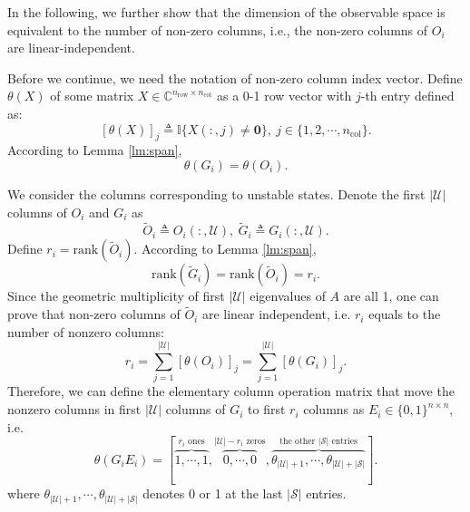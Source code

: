 \documentclass[journal]{IEEEtran}
\newcommand{\Cb}{{\mathbb{C}}}
\newcommand{\Ib}{{\mathbb{I}}}
\newcommand{\Uc}{{\mathcal{U}}}
\newcommand{\Sc}{{\mathcal{S}}}
\newcommand{\Oi}{{\tilde{O}_i}}
\newcommand{\Gi}{{\tilde{G}_i}}
\newcommand{\rank}{\text{rank}}
\begin{document}
	In the following, we further show that the dimension of the observable space is equivalent to the number of non-zero columns, i.e., the non-zero columns of $O_i$ are linear-independent. 
	
	Before we continue, we need the notation of non-zero column index vector. Define $\theta(X)$ of some matrix $X\in\Cb^{ n_{\text{row}}\times n_{\text{col}} }$ as a 0-1 row vector with $j$-th entry defined as:
	$$\left[\theta(X)\right]_j\triangleq \Ib\{X(:,j)\neq\mathbf{0} \},\ j\in\{1,2,\cdots,n_{\text{col}}\}. $$
	According to Lemma \ref{lm:span}, 
	\begin{equation}\label{eq:thetaGO}
		\theta(G_i)=\theta(O_i).
	\end{equation}
	
	We consider the columns corresponding to unstable states.
	Denote the first $|\Uc|$ columns of $O_i$ and $G_i$ as $$\Oi\triangleq O_i(:,\Uc),\ \Gi\triangleq G_i(:,\Uc) .$$
	Define $r_i=\rank(\Oi).$ According to Lemma \ref{lm:span}, 
	\begin{equation}\label{eq:rankOiGi}
		\rank(\Gi)=\rank(\Oi)=r_i .
	\end{equation}
	Since the geometric multiplicity of first $|\Uc|$ eigenvalues of $A$ are all 1, one can prove that non-zero columns of $\Oi$ are linear independent, i.e. $r_i$ equals to the number of nonzero columns:
	\begin{equation*}
		r_i=\sum_{j=1}^{|\Uc|} \left[\theta(O_i)\right]_j =\sum_{j=1}^{|\Uc|} \left[\theta(G_i)\right]_j .
	\end{equation*}
	Therefore, we can define the elementary column operation matrix that move the nonzero columns in first $|\Uc|$ columns of $G_i$ to first $r_i$ columns as $E_i\in\{0,1\}^{n\times n}$, i.e. 
	\begin{equation}
		\theta(G_i E_i)= [\overbrace{1,\cdots,1}^{r_i \text{ ones}},
		\overbrace{0,\cdots,0}^{|\Uc|-r_i\text{ zeros}},
		\overbrace{\theta_{|\Uc|+1},\cdots,\theta_{|\Uc|+|\Sc|}}^{\text{the other }|\Sc|\text{ entries}} ].
	\end{equation}
	where $\theta_{|\Uc|+1},\cdots,\theta_{|\Uc|+|\Sc|}$ denotes 0 or 1 at the last $|\Sc|$ entries.
	
\end{document}
